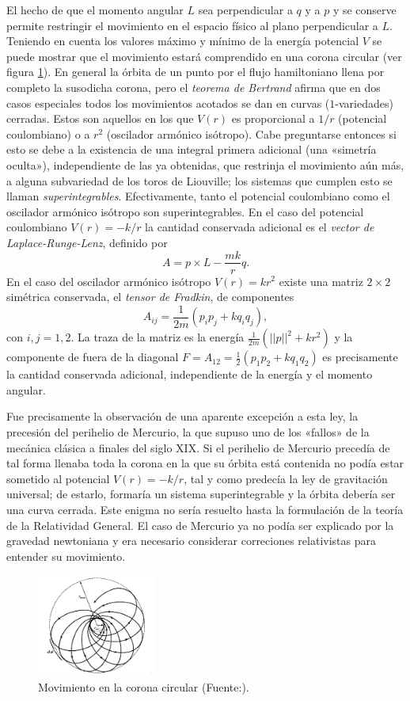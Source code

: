 El hecho de que el momento angular $L$ sea perpendicular a $q$ y a $p$ y se conserve permite restringir el movimiento en el espacio físico al plano perpendicular a $L$. Teniendo en cuenta los valores máximo y mínimo de la energía potencial $V$ se puede mostrar que el movimiento estará comprendido en una corona circular (ver figura \ref{fig:bertrand}). En general la órbita de un punto por el flujo hamiltoniano llena por completo la susodicha corona, pero el \emph{teorema de Bertrand} afirma que en dos casos especiales todos los movimientos acotados se dan en curvas ($1$-variedades) cerradas. Estos son aquellos en los que $V(r)$ es proporcional a $1/r$ (potencial coulombiano) o a $r^2$ (oscilador armónico isótropo). Cabe preguntarse entonces si esto se debe a la existencia de una integral primera adicional (una «simetría oculta»), independiente de las ya obtenidas, que restrinja el movimiento aún más, a alguna subvariedad de los toros de Liouville; los sistemas que cumplen esto se llaman \emph{superintegrables}. Efectivamente, tanto el potencial coulombiano como el oscilador armónico isótropo son superintegrables. En el caso del potencial coulombiano $V(r)=-k/r$ la cantidad conservada adicional es el \emph{vector de Laplace-Runge-Lenz}, definido por
\begin{equation*}
  A=p\times L - \frac{mk}{r}q.
\end{equation*}
En el caso del oscilador armónico isótropo $V(r)=kr^2$ existe una matriz $2\times 2$ simétrica conservada, el \emph{tensor de Fradkin}, de componentes
\begin{equation*}
  A_{ij}=\frac{1}{2m}(p_ip_j+kq_iq_j),
\end{equation*}
con $i,j=1,2$. La traza de la matriz es la energía $\tfrac{1}{2m}(||p||^2+kr^2)$ y la componente de fuera de la diagonal $F=A_{12}=\frac{1}{2}(p_1p_2+kq_1q_2)$ es precisamente la cantidad conservada adicional, independiente de la energía y el momento angular.

Fue precisamente la observación de una aparente excepción a esta ley, la precesión del perihelio de Mercurio, la que supuso uno de los «fallos» de la mecánica clásica a finales del siglo XIX. Si el perihelio de Mercurio precedía de tal forma llenaba toda la corona en la que su órbita está contenida no podía estar sometido al potencial $V(r)=-k/r$, tal y como predecía la ley de gravitación universal; de estarlo, formaría un sistema superintegrable y la órbita debería ser una curva cerrada. Este enigma no sería resuelto hasta la formulación de la teoría de la Relatividad General. El caso de Mercurio ya no podía ser explicado por la gravedad newtoniana y era necesario considerar correciones relativistas para entender su movimiento.

\begin{figure}[h]
  \centering
  \includegraphics[width=0.35\textwidth]{pics/bertrand}
  \caption{\small Movimiento en la corona circular (Fuente:\cite{landau}).}
  \label{fig:bertrand}
\end{figure}
